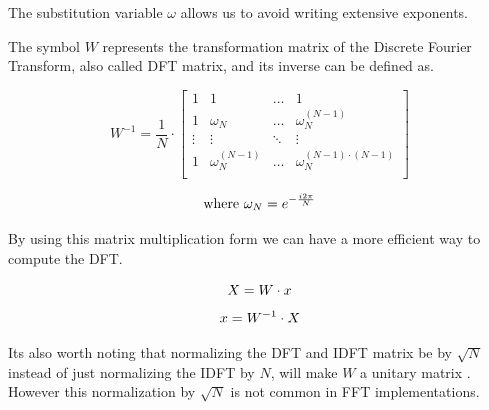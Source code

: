 \documentclass[
  oneside,
  11pt, a4paper,
  footinclude=true,
  headinclude=true,
  cleardoublepage=empty
]{scrbook}
\newcommand{\eqname}[1]{\tag*{#1}}%
\begin{document}
The substitution variable \(\omega\) allows us to avoid writing extensive exponents.

The symbol \(W\) represents the transformation matrix of the Discrete Fourier Transform, also called DFT matrix, and its inverse can be defined as.

\begin{equation*}
    W^{-1} = \frac{1}{N} \cdot
    \begin{bmatrix}
        1      & 1                  & \dots  & 1                              \\
        1      & \omega_{N}         & \dots  & \omega_{N}^{(N-1)}             \\
        \vdots & \vdots             & \ddots & \vdots                         \\
        1      & \omega_{N}^{(N-1)} & \dots  & \omega_{N}^{(N-1) \cdot (N-1)} \\
    \end{bmatrix}
\end{equation*}

\begin{equation*}
    \text{where } \omega_{N} = e^{- \frac{i 2 \pi}{N}} \\
\end{equation*}

By using this matrix multiplication form we can have a more efficient way to compute the DFT.  

\begin{equation*}
    X = W \cdot x \\ %
\end{equation*}
\begin{equation*}
    x = W^{-1} \cdot X \\ %
\end{equation*}

Its also worth noting that normalizing the DFT and IDFT matrix be by  \( \sqrt{N} \) instead of just normalizing the IDFT by \(N\), will make \(W\) a unitary matrix \cite{horn2012matrix}. However this normalization by \( \sqrt{N} \) is not common in FFT implementations.

\end{document}

